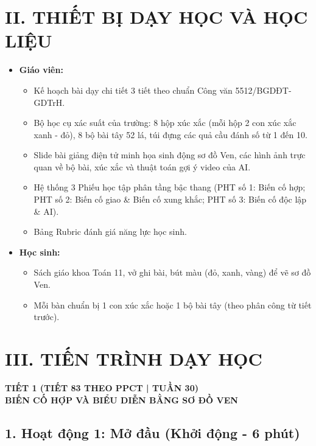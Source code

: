 \documentclass[12pt, a4paper]{article}
\begin{document}
\section*{II. THIẾT BỊ DẠY HỌC VÀ HỌC LIỆU}

\begin{itemize}[leftmargin=1.2cm]
    \item \textbf{Giáo viên:}
    \begin{itemize}[leftmargin=0.6cm]
        \item Kế hoạch bài dạy chi tiết 3 tiết theo chuẩn Công văn 5512/BGDĐT-GDTrH.
        \item Bộ học cụ xác suất của trường: 8 hộp xúc xắc (mỗi hộp 2 con xúc xắc xanh - đỏ), 8 bộ bài tây 52 lá, túi đựng các quả cầu đánh số từ 1 đến 10.
        \item Slide bài giảng điện tử minh họa sinh động sơ đồ Ven, các hình ảnh trực quan về bộ bài, xúc xắc và thuật toán gợi ý video của AI.
        \item Hệ thống 3 Phiếu học tập phân tầng bậc thang (PHT số 1: Biến cố hợp; PHT số 2: Biến cố giao & Biến cố xung khắc; PHT số 3: Biến cố độc lập & AI).
        \item Bảng Rubric đánh giá năng lực học sinh.
    \end{itemize}

    \item \textbf{Học sinh:}
    \begin{itemize}[leftmargin=0.6cm]
        \item Sách giáo khoa Toán 11, vở ghi bài, bút màu (đỏ, xanh, vàng) để vẽ sơ đồ Ven.
        \item Mỗi bàn chuẩn bị 1 con xúc xắc hoặc 1 bộ bài tây (theo phân công từ tiết trước).
    \end{itemize}
\end{itemize}

\section*{III. TIẾN TRÌNH DẠY HỌC}

\begin{center}
    \textbf{\large TIẾT 1 (TIẾT 83 THEO PPCT | TUẦN 30)}\\[4pt]
    \textbf{\large BIẾN CỐ HỢP VÀ BIỂU DIỄN BẰNG SƠ ĐỒ VEN}
\end{center}

\subsection*{1. Hoạt động 1: Mở đầu (Khởi động - 6 phút)}
\end{document}

